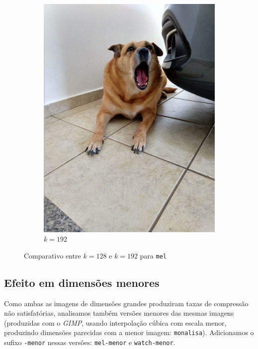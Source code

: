 \documentclass[brazilian,a4paper,twocolumn]{article}
\begin{document}
\begin{figure}[H]
\begin{subfigure}{0.15\textwidth}
                \includegraphics[width=\textwidth,keepaspectratio]{mel-192}
                \caption{$k=192$}
                \label{fig:mel-192}
            \end{subfigure}

            \caption{Comparativo entre $k=128$ e $k=192$ para \texttt{mel}}
            \label{fig:mel-comparativo}
        \end{figure}

    \subsection{Efeito em dimensões menores}

        Como ambas as imagens de dimensões grandes produziram taxas de compressão não satisfatórias, analisamos também versões menores das mesmas imagens (produzidas com o \emph{GIMP}, usando interpolação cúbica com escala menor, produzindo dimensões parecidas com a menor imagem: \texttt{monalisa}). Adicionamos o sufixo \texttt{-menor} nessas versões: \texttt{mel-menor} e \texttt{watch-menor}.
\end{document}
